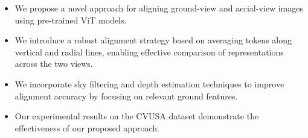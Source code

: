 \begin{itemize}
    \item We propose a novel approach for aligning ground-view and aerial-view images using pre-trained ViT models.
    \item We introduce a robust alignment strategy based on averaging tokens along vertical and radial lines, enabling effective comparison of representations across the two views.
    \item We incorporate sky filtering and depth estimation techniques to improve alignment accuracy by focusing on relevant ground features.
    \item Our experimental results on the CVUSA dataset demonstrate the effectiveness of our proposed approach.
\end{itemize}